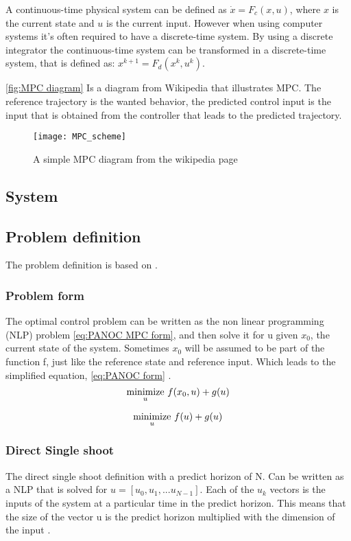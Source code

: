 	A continuous-time physical system can be defined as $\dot{x}=F_c(x,u)$, where $x$ is the current state and $u$ is the current input. However when using computer systems it's often required to have a discrete-time system. By using a discrete integrator the continuous-time system can be transformed in a discrete-time system, that is defined as: $x^{k+1}=F_d(x^{k},u^{k})$. 
	
	\eqref{fig:MPC diagram} Is a diagram from Wikipedia \cite{Wikipedia} that illustrates MPC. The reference trajectory is the wanted behavior, the predicted control input is the input that is obtained from the controller that leads to the predicted trajectory.
	\begin{figure}[h]
		\centering
		\texttt{[image: MPC\_scheme]}
		\caption{A simple MPC diagram from the wikipedia page \cite{Wikipedia}}
		\label{fig:MPC diagram}
	\end{figure}
			
	\subsection{System}
		
	\subsection{Problem definition}
	The problem definition is based on \cite{Diehl2005}.
		\subsubsection{Problem form}
			The optimal control problem can be written as the non linear programming (NLP) problem  \eqref{eq:PANOC MPC form}, and then solve it for u given $x_0$, the current state of the system. Sometimes $x_0$ will be assumed to be part of the function f, just like the reference state and reference input. Which leads to the simplified equation, \eqref{eq:PANOC form} .
			\begin{equation}
				\underset{u}{\operatorname*{minimize}} \  f(x_0,u) + g(u)
				\label{eq:PANOC MPC form}
			\end{equation}
			
			\begin{equation}
				\underset{u}{\operatorname*{minimize}} \  f(u) + g(u)
				\label{eq:PANOC form}
			\end{equation}
		\subsubsection{Direct Single shoot}
			The direct single shoot definition with a predict horizon of N. Can be written as a NLP that is solved for $u=[u_0,u_1,... u_{N-1}]$. Each of the $u_k$ vectors is the inputs of the system at a particular time in the predict horizon. This means that the size of the vector u is the predict horizon multiplied with the dimension of the input .
			
